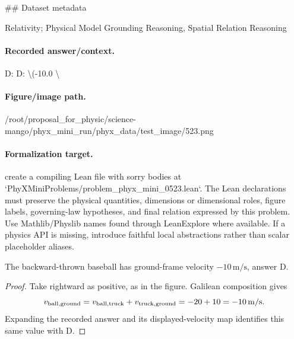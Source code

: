\#\# Dataset metadata

Relativity; Physical Model Grounding Reasoning, Spatial Relation Reasoning

\paragraph{Recorded answer/context.}
D: D: \textbackslash{}(-10.0 \textbackslash{}

\paragraph{Figure/image path.}
/root/proposal\_for\_physic/science-mango/phyx\_mini\_run/phyx\_data/test\_image/523.png

\paragraph{Formalization target.}
create a compiling Lean file with sorry bodies at `PhyXMiniProblems/problem\_phyx\_mini\_0523.lean`. The Lean declarations must preserve the physical quantities, dimensions or dimensional roles, figure labels, governing-law hypotheses, and final relation expressed by this problem.
Use Mathlib/Physlib names found through LeanExplore where available. If a physics API is missing, introduce faithful local abstractions rather than scalar placeholder aliases.

\begin{theorem}
\label{thm:physics:phyx_mini_0523:target}
The backward-thrown baseball has ground-frame velocity
\(-10\,\mathrm{m/s}\), answer D.
\end{theorem}
\begin{proof}
Take rightward as positive, as in the figure.  Galilean composition gives
\[
 v_{\rm ball,ground}
 =v_{\rm ball,truck}+v_{\rm truck,ground}
 =-20+10=-10\,\mathrm{m/s}.
\]
Expanding the recorded answer and its displayed-velocity map identifies this
same value with D.
\end{proof}

